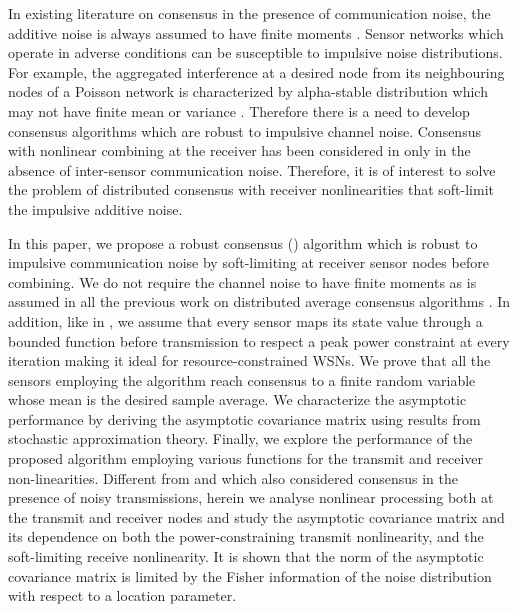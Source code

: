 \documentclass[onecolumn, draft, 12pt]{IEEEtran}
\begin{document}
In existing literature on consensus in the presence of communication noise, the additive noise is always assumed to have finite moments \cite{Boyd2007,Touri2009,MinyiHuang2007,Pescosolido2008,Barbarossa2008,MinyiHuang2008,AysalBarner2010,Nedic2011cvx, KarMoura2009,KarMoura2007}. Sensor networks which operate in adverse conditions can be susceptible to impulsive noise distributions. For example, the aggregated interference at a desired node from its neighbouring nodes of a Poisson network is characterized by alpha-stable distribution which may not have finite mean or variance \cite{Sousa1992,Ilow1998,Yang2003,Hughes2000,Haenggi2009,Win2009,JunghoonLee2011,RajanTep2010}. Therefore there is a need to develop consensus algorithms which are robust to impulsive channel noise. Consensus with nonlinear combining at the receiver has been considered in \cite{KhanKar,OlfatiSaber2003,Ulrich2008,HuiWassim2008,WenwuChen2011,Ajorlou2011} only in the absence of inter-sensor communication noise. Therefore, it is of interest to solve the problem of distributed consensus with receiver nonlinearities that soft-limit the impulsive additive noise.

In this paper, we propose a robust consensus () algorithm which is robust to impulsive communication noise by soft-limiting at receiver sensor nodes before combining. We do not require the channel noise to have finite moments as is assumed in all the previous work on distributed average consensus algorithms \cite{Boyd2007,Touri2009,MinyiHuang2007,Pescosolido2008,Barbarossa2008,MinyiHuang2008,AysalBarner2010,Nedic2011cvx, KarMoura2009,KarMoura2007}. In addition, like in \cite{dastep2013}, we assume that every sensor maps its state value through a bounded function before transmission to respect a peak power constraint at every iteration making it ideal for resource-constrained WSNs. We prove that all the sensors employing the  algorithm reach consensus to a finite random variable whose mean is the desired sample average. We characterize the asymptotic performance by deriving the asymptotic covariance matrix using results from stochastic approximation theory. Finally, we explore the performance of the proposed algorithm employing various functions for the transmit and receiver non-linearities. Different from \cite{MinyiHuang2008,KarMoura2009} and \cite{KarMoura2007} which also considered consensus in the presence of noisy transmissions, herein we analyse nonlinear processing both at the transmit and receiver nodes and study the asymptotic covariance matrix and its dependence on both the power-constraining transmit nonlinearity, and the soft-limiting receive nonlinearity. It is shown that the norm of the asymptotic covariance matrix is limited by the Fisher information of the noise distribution with respect to a location parameter.
\end{document}
